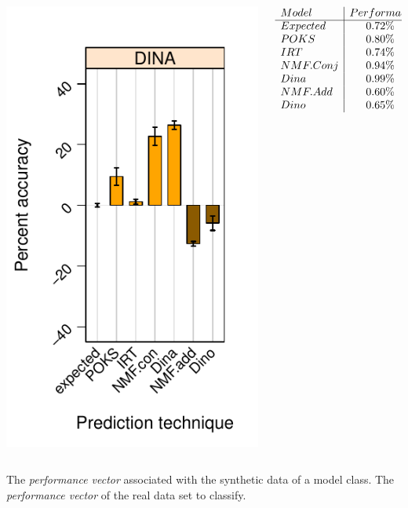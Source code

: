 \documentclass{beamer}
\begin{document}
\begin{frame}
\begin{overprint}
\begin{columns}
\begin{column}{0.5\textwidth}
   \includegraphics[trim=0cm 0cm 0cm 1.5cm,clip=true,scale =0.55] {images/Predictive-Preformace_Base.pdf}

		 \end{column}
	      \begin{column}{0.5\textwidth}
	      \[\begin{array}{l|c}
	      Model & Performace\\
	      \cline{1-2}
			Expected & 0.72\%\\
			POKS & 0.80\%\\
			IRT & 0.74\%\\
			NMF.Conj & 0.94\%\\
			Dina & 0.99\%\\
			NMF.Add & 0.60\%\\
			Dino & 0.65\%
			\end{array}
			\]
	      \end{column}
	     \end{columns}
\vspace{3cm} The \textit{performance vector} associated with the synthetic data of a model class.
\vspace{3cm} The \textit{performance vector} of the real data set to classify.
\end{overprint}
\end{frame}
\end{document}
